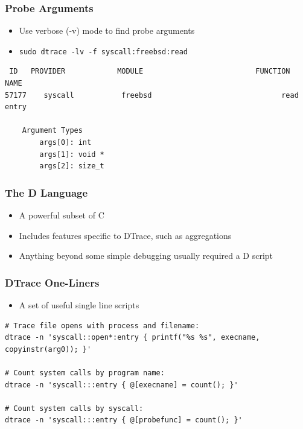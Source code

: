 \documentclass[pdftex]{beamer} %
\begin{document}
\begin{frame}[fragile]
  \frametitle{Probe Arguments}
  \begin{itemize}
  \item Use verbose (-v) mode to find probe arguments
  \item \Verb+sudo dtrace -lv -f syscall:freebsd:read+
  \end{itemize}
\begin{verbatim}
 ID   PROVIDER            MODULE                          FUNCTION NAME
57177    syscall           freebsd                              read entry

	Argument Types
		args[0]: int
		args[1]: void *
		args[2]: size_t
\end{verbatim}
\end{frame}

\begin{frame}
  \frametitle{The D Language}
  \begin{itemize}
  \item A powerful subset of C
  \item Includes features specific to DTrace, such as aggregations
  \item Anything beyond some simple debugging usually required a D
    script
  \end{itemize}
\end{frame}

\begin{frame}[fragile]
  \frametitle{DTrace One-Liners}
  \begin{itemize}
  \item A set of useful single line scripts
  \end{itemize}
\begin{lstlisting}
# Trace file opens with process and filename:
dtrace -n 'syscall::open*:entry { printf("%s %s", execname, copyinstr(arg0)); }'

# Count system calls by program name:
dtrace -n 'syscall:::entry { @[execname] = count(); }'

# Count system calls by syscall:
dtrace -n 'syscall:::entry { @[probefunc] = count(); }'
\end{lstlisting}
\end{frame}
\end{document}
